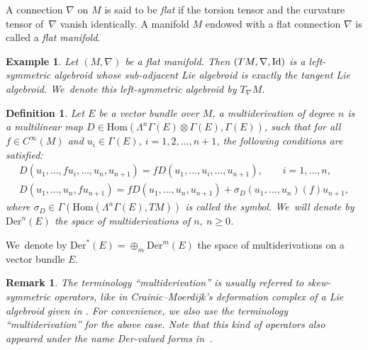 \documentclass[10pt,a4paper]{amsart}
\numberwithin{equation}{section}
\newtheorem{ex}[thm]{Example}
\newtheorem{rmk}[thm]{Remark}
\newtheorem{defi}[thm]{Definition}
\newcommand{\Id}{\rm{Id}}
\newcommand{\Hom}{\mathrm{Hom}}
\newcommand{\Der}{\mathrm{Der}}
\begin{document}
A connection $\nabla$ on $M$ is said to be {\it flat} if the torsion tensor and the curvature tensor of~$\nabla$ vanish identically. A manifold $M$ endowed with a flat connection $\nabla$ is called a {\it flat manifold}.

\begin{ex}\label{ex:main}Let $(M,\nabla)$ be a flat manifold. Then $(TM,\nabla,\Id)$ is a left-symmetric algebroid whose sub-adjacent Lie algebroid is
exactly the tangent Lie algebroid. We~denote this left-symmetric algebroid by $T_\nabla M$.
\end{ex}

\begin{defi}
Let $E$ be a vector bundle over $M$, a {\it multiderivation} of degree $n$
is a multilinear map $D\in \Hom(\Lambda^{n}\Gamma(E)\otimes
\Gamma(E),\Gamma(E))$, such that for all $f\in C^\infty(M)$ and
$u_i\in \Gamma(E)$, $i=1,2,\dots,n+1$, the following conditions are satisfied:
 \begin{gather*}
D(u_1,\dots,fu_i,\dots,u_{n},u_{n+1})=f D(u_1,\dots,u_i,\dots,u_{n+1}),\qquad i=1,\dots,n,
\\
D(u_1,\dots,u_{n},fu_{n+1})=f D(u_1,\dots,u_{n},u_{n+1})+\sigma_D(u_1,\dots,u_{n})(f)u_{n+1},
\end{gather*}
where $\sigma_D\in \Gamma(\Hom(\Lambda^{n}\Gamma(E),TM))$ is called the
{\it symbol}. We~will denote by $\Der^n(E)$ the space of multiderivations
of $n,~n\geq 0$.
\end{defi}
We~denote by $\Der^*(E)=\oplus_{m}\Der^m(E)$ the space of multiderivations on a vector bundle $E$.

\begin{rmk}
The terminology ``multiderivation'' is usually referred to skew-symmetric ope\-ra\-tors, like in Crainic--Moerdijk's deformation complex of a Lie algebroid given in \cite{deformation-cohomology-LA}. For convenience, we also use the terminology ``multiderivation'' for the above case. Note that this kind of operators also appeared under the name {\rm Der}-valued forms in~\cite{Vita}.	
	\end{rmk}
\end{document}
